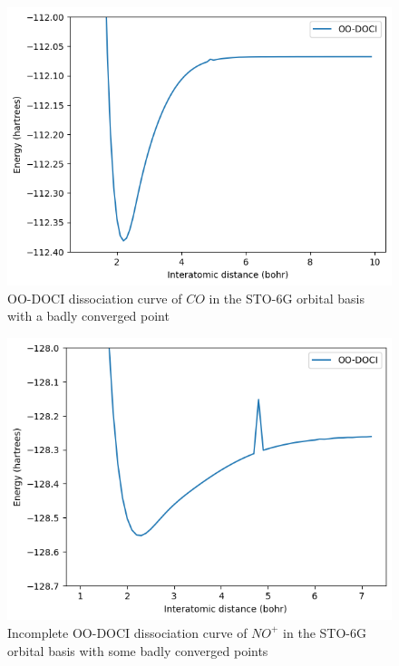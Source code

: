 \documentclass[twoside,twocolumn,9pt]{article}
\begin{document}
\begin{figure}
  \includegraphics[width=\linewidth]{CO.png}
  \caption{OO-DOCI dissociation curve of $CO$ in the STO-6G orbital basis with a badly converged point}\label{CO}
\end{figure}

\begin{figure}
  \includegraphics[width=\linewidth]{NO+.png}
  \caption{Incomplete OO-DOCI dissociation curve of $NO^+$ in the STO-6G orbital basis with some badly converged points}\label{NO+}
\end{figure}
\end{document}
